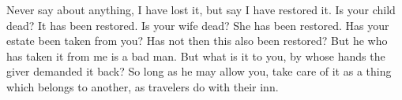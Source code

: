 Never say about anything,  I have lost it, but say I have  restored it. Is your
child dead? It has been restored. Is your wife dead? She has been restored. Has
your estate been taken  from you? Has not then this also  been restored? But he
who has taken  it from me is a bad  man. But what is it to  you, by whose hands
the giver demanded it back?  So long as he may allow you, take  care of it as a
thing which belongs to another, as travelers do with their inn.
